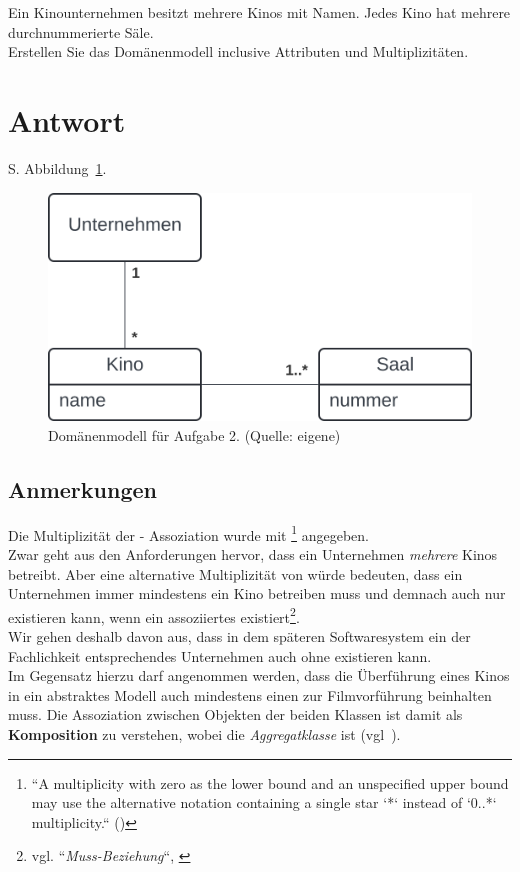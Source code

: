 Ein Kinounternehmen besitzt mehrere Kinos mit Namen.
Jedes Kino hat mehrere durchnummerierte Säle.\\
Erstellen Sie das Domänenmodell inclusive Attributen und Multiplizitäten.


\section*{Antwort}

S. Abbildung~\ref{fig:kino}.\\

\begin{figure}
    \centering
    \includegraphics[scale=0.5]{chapters/aufgabe 2/img/kino}
    \caption{Domänenmodell für Aufgabe 2. (Quelle: eigene)}
    \label{fig:kino}
\end{figure}

\subsection*{Anmerkungen}
Die Multiplizität der  -  Assoziation wurde mit \code{*}\footnote{
    ``A multiplicity with zero as the lower bound and an unspecified upper bound may use the alternative notation containing a single star `*` instead of `0..*`
    multiplicity.`` (\cite[35]{UML17})
} angegeben.\\
Zwar geht aus den Anforderungen hervor, dass ein Unternehmen \textit{mehrere} Kinos betreibt.
Aber eine alternative Multiplizität von  würde bedeuten, dass ein Unternehmen immer mindestens ein Kino betreiben muss und demnach auch nur existieren kann, wenn ein assoziiertes  existiert\footnote{
    vgl. ``\textit{Muss-Beziehung}``, \cite[166 ff.]{Bal05}
}.\\
Wir gehen deshalb davon aus, dass in dem späteren Softwaresystem ein der Fachlichkeit entsprechendes Unternehmen auch ohne  existieren kann.\\
Im Gegensatz hierzu darf angenommen werden, dass die Überführung eines Kinos in ein abstraktes Modell auch mindestens einen  zur Filmvorführung beinhalten muss.
Die Assoziation zwischen Objekten der beiden Klassen ist damit als \textbf{Komposition} zu verstehen, wobei  die \textit{Aggregatklasse} ist (vgl~\cite[49 f.]{Bal05}).

